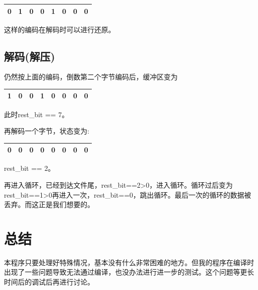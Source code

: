 \documentclass[a4paper]{ctexart}
\begin{document}
\begin{tabular}{|c|c|c|c|c|c|c|c|}
	\hline
	0 & 1 & 0 & 0 & 1 & 0 & 0 & 0 \\ \hline
\end{tabular}

这样的编码在解码时可以进行还原。

\subsection{解码(解压)}

仍然按上面的编码，倒数第二个字节编码后，缓冲区变为

\begin{tabular}{|c|c|c|c|c|c|c|c|}
	\hline
	1 & 0 & 0 & 1 & 0 & 0 & 0 & 0\\ \hline
\end{tabular}

此时rest\_bit == 7。

再解码一个字节，状态变为:

\begin{tabular}{|c|c|c|c|c|c|c|c|}
	\hline
	0 & 0 & 0 & 0 & 0 & 0 & 0 & 0 \\ \hline
\end{tabular}

rest\_bit == 2。

再进入循环，已经到达文件尾，rest\_bit==2>0，进入循环。循环过后变为rest\_bit==1>0再进入一次，rest\_bit==0，跳出循环。最后一次的循环的数据被丢弃。而这正是我们想要的。

\section{总结}

本程序只要处理好特殊情况，基本没有什么非常困难的地方。但我的程序在编译时出现了一些问题导致无法通过编译，也没办法进行进一步的测试。这个问题等更长时间后的调试后再进行讨论。
\end{document}
